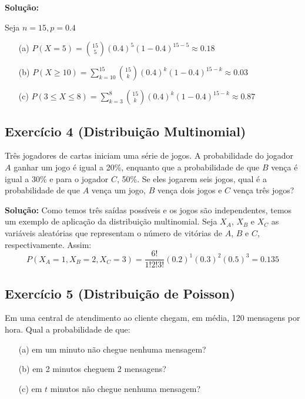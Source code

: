 \documentclass{article}
\begin{document}
\vspace{0.5cm}
\textbf{Solução:}

Seja $n=15, p=0.4$
\begin{enumerate}
    \item[(a)] $P(X=5) = \binom{15}{5}(0.4)^5 (1-0.4)^{15-5} \approx 0.18$
    \item[(b)] $P(X \geq 10) = \sum_{k=10}^{15} \binom{15}{k}(0.4)^k (1-0.4)^{15-k} \approx 0.03$
    \item[(c)] $P(3 \leq X \leq 8) = \sum_{k=3}^{8} \binom{15}{k}(0.4)^k (1-0.4)^{15-k} \approx 0.87$
\end{enumerate}

\subsection{Exercício 4 (Distribuição Multinomial)}
Três jogadores de cartas iniciam uma série de jogos. 
A probabilidade do jogador $A$ ganhar um jogo é igual a 20\%, 
enquanto que a probabilidade de que $B$ vença é igual a 30\% 
e para o jogador $C$, 50\%. 
Se eles jogarem seis jogos, qual é a probabilidade de que 
$A$ vença um jogo, $B$ vença dois jogos e $C$ vença três jogos?

\vspace{0.5cm}
\textbf{Solução:} 
Como temos três saídas possíveis e os jogos são independentes, 
temos um exemplo de aplicação da distribuição multinomial. 
Seja $X_A$, $X_B$ e $X_C$ as variáveis aleatórias que 
representam o número de vitórias de $A$, $B$ e $C$, respectivamente. 
Assim:
    $$
    P(X_A = 1, X_B = 2, X_C = 3) 
    = \frac{6!}{1! 2! 3!}(0.2)^1 (0.3)^2 (0.5)^3 
    = 0.135
    $$

\subsection{Exercício 5 (Distribuição de Poisson)}
Em uma central de atendimento ao cliente chegam, em média, 120 mensagens por hora. Qual a probabilidade de que:
\begin{enumerate}
    \item[(a)] em um minuto não chegue nenhuma mensagem?
    \item[(b)] em 2 minutos cheguem 2 mensagens?
    \item[(c)] em $t$ minutos não chegue nenhuma mensagem?
\end{enumerate}
\end{document}
